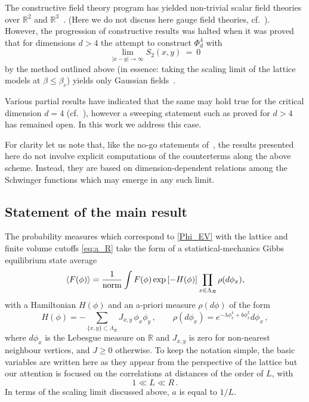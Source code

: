 \documentclass[a4paper,oneside,11pt]{article}
\def\R{\mathbb{R}}
\newcommand{\be}[1]{\begin{equation}\label{#1}}
\newcommand{\ee}{\end{equation}}
\numberwithin{equation}{section}
\numberwithin{equation}{section}
\numberwithin{equation}{section}
\def\be{\begin{equation}}
\def\ee{\end{equation}}
\begin{document}
The constructive field theory   
program  has yielded non-trivial scalar field theories over $\R^2$ and $\R^3$~\cite{BryFroSpe82,GliJaf73,GRS75,OS75}.   (Here we do not discuss here gauge field theories, 
cf.~\cite{JW}). 
However, the  progression of constructive results was halted when it was proved  that for dimensions $d>4$ the attempt to construct  $\Phi^4_d$  with 
\be\label{Phi_even}
\lim_{|x-y| \to \infty} S_2(x,y)  \ =\  0 
\ee 
by the method outlined above (in essence: taking the scaling limit of the lattice models at $\beta \leq \beta_c$) 
yields only  Gaussian fields~\cite{Aiz82,Fro82}. 


Various partial results have indicated that the same may hold true for the critical dimension $d=4$  
(cf.~\cite{AizGra83, ACF83, BauBrySla14,GawKup85, HarTas87}),
 however a sweeping statement such as proved for $d>4$ has remained  open.   In this work we address this case.   

For clarity let us note that, like the no-go statements of~\cite{Aiz82,Fro82},  the results  presented here do not involve explicit computations of the counterterms along the above scheme.  Instead, they are based on dimension-dependent relations among the Schwinger functions which may emerge in any such limit. 


\subsection{Statement of the main result} 
 

The probability measures which correspond to \eqref{Phi_EV} with the lattice and finite volume cutoffs \eqref{eq:a_R} take the form of a statistical-mechanics Gibbs equilibrium state average   
\be \label{Phi_SM}
\langle F(\phi) \rangle  = \frac 1 {\rm norm}   \int  F(\phi) \exp{[-H(\phi)]}  \prod_{x\in \Lambda_R} \rho( d \phi_x) ,
\ee 
with a Hamiltonian  $H(\phi)$ and an a-priori measure $\rho(d \phi)$   of the form
\be \label{H}
H(\phi) = -\sum_{\{x,y\}\subset \Lambda_R}J_{x,y}\,\phi_x \phi_y    \, , \qquad \rho( d \phi_x) =  e^{- \lambda \phi_x^4 + b \phi^2_x}  d \phi_x \,,  
\ee 
where $d\phi_x$ is the Lebesgue measure on $\R$ and $J_{x,y}$ is zero for non-nearest neighbour vertices, and $J\ge0$ otherwise.   To keep the notation simple, the basic variables are written here as they appear from the perspective of the lattice but our attention is focused on the correlations  at distances of the order of $L$, with 
\be 
1 \ll L \ll R \, .
\ee 
In terms of the scaling limit discussed above, $a$ is equal to $1/L$. 
\end{document}
